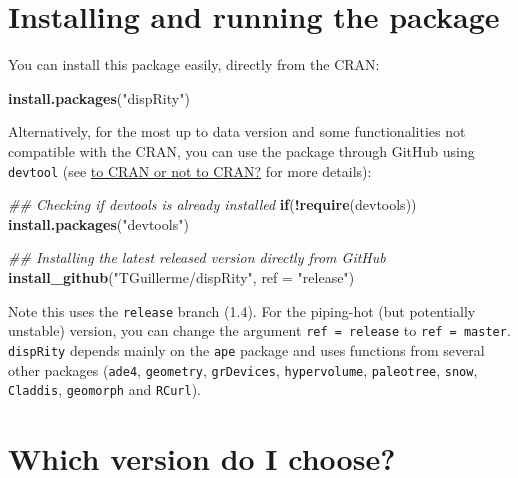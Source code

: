 \documentclass[]{book}
\newenvironment{Shaded}{\begin{snugshade}}{\end{snugshade}}
\newcommand{\CommentTok}[1]{\textcolor[rgb]{0.56,0.35,0.01}{\textit{#1}}}
\newcommand{\ControlFlowTok}[1]{\textcolor[rgb]{0.13,0.29,0.53}{\textbf{#1}}}
\newcommand{\DataTypeTok}[1]{\textcolor[rgb]{0.13,0.29,0.53}{#1}}
\newcommand{\KeywordTok}[1]{\textcolor[rgb]{0.13,0.29,0.53}{\textbf{#1}}}
\newcommand{\NormalTok}[1]{#1}
\newcommand{\OperatorTok}[1]{\textcolor[rgb]{0.81,0.36,0.00}{\textbf{#1}}}
\newcommand{\StringTok}[1]{\textcolor[rgb]{0.31,0.60,0.02}{#1}}
\begin{document}
\hypertarget{installing-and-running-the-package}{%
\section{Installing and running the package}\label{installing-and-running-the-package}}

You can install this package easily, directly from the CRAN:

\begin{Shaded}
\begin{Highlighting}[]
\KeywordTok{install.packages}\NormalTok{(}\StringTok{"dispRity"}\NormalTok{)}
\end{Highlighting}
\end{Shaded}

Alternatively, for the most up to data version and some functionalities not compatible with the CRAN, you can use the package through GitHub using \texttt{devtool} (see \protect\hyperlink{noCRAN}{to CRAN or not to CRAN?} for more details):

\begin{Shaded}
\begin{Highlighting}[]
\CommentTok{## Checking if devtools is already installed}
\ControlFlowTok{if}\NormalTok{(}\OperatorTok{!}\KeywordTok{require}\NormalTok{(devtools)) }\KeywordTok{install.packages}\NormalTok{(}\StringTok{"devtools"}\NormalTok{)}

\CommentTok{## Installing the latest released version directly from GitHub}
\KeywordTok{install_github}\NormalTok{(}\StringTok{"TGuillerme/dispRity"}\NormalTok{, }\DataTypeTok{ref =} \StringTok{"release"}\NormalTok{)}
\end{Highlighting}
\end{Shaded}

Note this uses the \texttt{release} branch (1.4).
For the piping-hot (but potentially unstable) version, you can change the argument \texttt{ref\ =\ release} to \texttt{ref\ =\ master}.
\texttt{dispRity} depends mainly on the \texttt{ape} package and uses functions from several other packages (\texttt{ade4}, \texttt{geometry}, \texttt{grDevices}, \texttt{hypervolume}, \texttt{paleotree}, \texttt{snow}, \texttt{Claddis}, \texttt{geomorph} and \texttt{RCurl}).

\hypertarget{version}{%
\section{Which version do I choose?}\label{version}}
\end{document}
